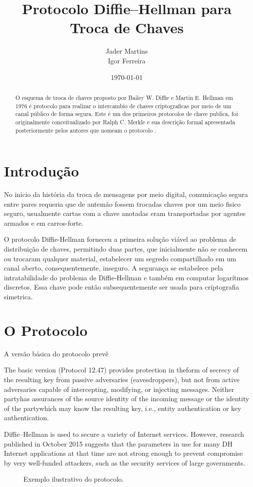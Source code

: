 \documentclass{article}
\title{Protocolo Diffie–Hellman para Troca de Chaves}
\author{Jader Martins\\
        Igor Ferreira}
\date{\today}
\begin{document}
\maketitle

\begin{abstract}
    O esquema de troca de chaves proposto por Bailey W. Diffie e
    Martin E. Hellman em 1976 é protocolo para realizar
    o intercambio de chaves criptograficas por meio de um canal público
    de forma segura\cite{Diffie}. Este é um dos primeiros protocolos de
    chave publica, foi originalmente conceitualizado por Ralph C. Merkle
    e sua descrição formal apresentada posteriormente pelos autores que
    nomeam o protocolo \cite{Merkle}.
\end{abstract}

\section{Introdução}%
\label{sec:introducao}
No inicio da história da troca de mensagens por meio digital, comunicação
segura entre pares requeria que de antemão fossem trocadas chaves por um
meio fisico seguro, usualmente cartas com a chave anotadas eram
transportadas por agentes armados e em carros-forte.

O protocolo Diffie-Hellman forneceu a primeira solução viável ao problema
de distribuição de chaves, permitindo duas partes, que inicialmente não se
conhecem ou trocaram qualquer material, estabelecer um segredo compartilhado
em um canal aberto, consequentemente, inseguro. A segurança se estabelece
pela intratabilidade do problema de Diffie-Hellman e também em computar
logarítmos discretos\cite{katz1996handbook}. Essa chave pode então
subsequentemente ser usada para criptografia simetrica.


\section{O Protocolo}%
\label{sec:o_protocolo}



A versão básica do protocolo prevê

The basic version (Protocol 12.47) provides protection in theform of secrecy of the resulting key from passive adversaries (eavesdroppers), but not from active adversaries capable of intercepting, modifying, or injecting messages. Neither partyhas assurances of the source identity of the incoming message or the identity of the partywhich may know the resulting key, i.e., entity authentication or key authentication.

Diffie–Hellman is used to secure a variety of Internet services. However, research published in October 2015 suggests that the parameters in use for many DH Internet applications at that time are not strong enough to prevent compromise by very well-funded attackers, such as the security services of large governments.

\begin{figure}[htpb]
    \centering
    
    \caption{Exemplo ilustrativo do protocolo.}%
    \label{fig:diagram}
\end{figure}



\end{document}
